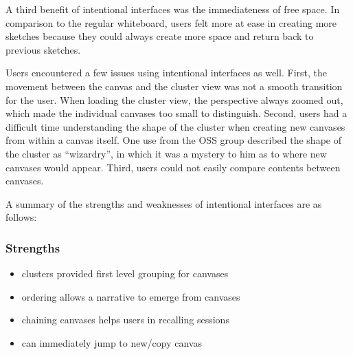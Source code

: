 \documentclass[12pt,fleqn]{ucithesis}
\begin{document}
A third benefit of intentional interfaces was the immediateness of free space. In comparison to the regular whiteboard, users felt more at ease in creating more sketches because they could always create more space and return back to previous sketches. 


Users encountered a few issues using intentional interfaces as well. First, the movement between the canvas and the cluster view was not a smooth transition for the user. When loading the cluster view, the perspective always zoomed out, which made the individual canvases too small to distinguish. Second, users had a difficult time understanding the shape of the cluster when creating new canvases from within a canvas itself. One use from the OSS group described the shape of the cluster as ``wizardry'', in which it was a mystery to him as to where new canvases would appear. Third, users could not easily compare contents between canvases.


A summary of the strengths and weaknesses of intentional interfaces are as follows:

\subsubsection{Strengths}

\begin{itemize}
	\item clusters provided first level grouping for canvases
	\item ordering allows a narrative to emerge from canvases
	\item chaining canvases helps users in recalling sessions
	\item can immediately jump to new/copy canvas
\end{itemize}
\end{document}
